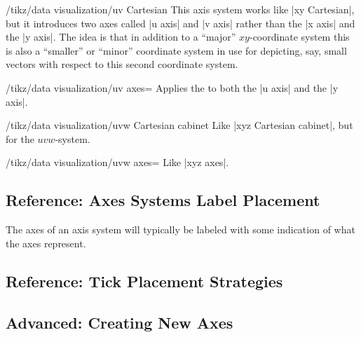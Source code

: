\begin{key}{/tikz/data visualization/uv Cartesian}
  This axis system works like |xy Cartesian|, but it introduces two
  axes called |u axis| and |v axis| rather than the |x axis| and the
  |y axis|. The idea is that in addition to a ``major''
  $xy$-coordinate system this is also a ``smaller'' or ``minor''
  coordinate system in use for depicting, say, small vectors with
  respect to this second coordinate system.
  
  \begin{key}{/tikz/data visualization/uv axes=}
    Applies the  to both the |u axis| and the |y axis|.
  \end{key}

\end{key}

\begin{key}{/tikz/data visualization/uvw Cartesian cabinet}
  Like |xyz Cartesian cabinet|, but for the $uvw$-system.
  
  \begin{key}{/tikz/data visualization/uvw axes=}
    Like |xyz axes|.
  \end{key}
\end{key}



\subsection{Reference: Axes Systems Label Placement}

The axes of an axis system will typically be labeled with some
indication of what the axes represent.


\subsection{Reference: Tick Placement Strategies}

\subsection{Advanced: Creating New Axes}

